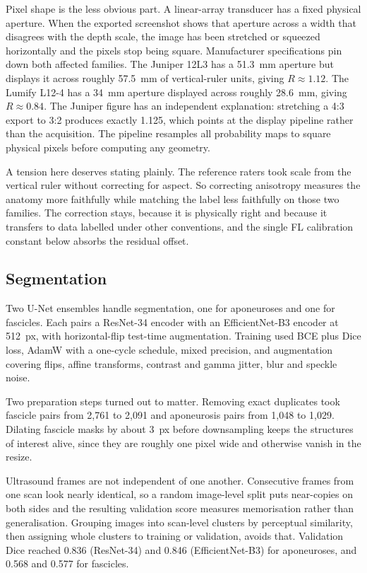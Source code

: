 \documentclass[12pt]{article}
\begin{document}
Pixel shape is the less obvious part. A linear-array transducer has a fixed
physical aperture. When the exported screenshot shows that aperture across a
width that disagrees with the depth scale, the image has been stretched or
squeezed horizontally and the pixels stop being square. Manufacturer
specifications pin down both affected families. The Juniper 12L3 has a 51.3~mm
aperture but displays it across roughly 57.5~mm of vertical-ruler units, giving
$R \approx 1.12$. The Lumify L12-4 has a 34~mm aperture displayed across roughly
28.6~mm, giving $R \approx 0.84$. The Juniper figure has an independent
explanation: stretching a 4:3 export to 3:2 produces exactly 1.125, which points
at the display pipeline rather than the acquisition. The pipeline resamples all
probability maps to square physical pixels before computing any geometry.

A tension here deserves stating plainly. The reference raters took scale from
the vertical ruler without correcting for aspect. So correcting anisotropy
measures the anatomy more faithfully while matching the label less faithfully on
those two families. The correction stays, because it is physically right and
because it transfers to data labelled under other conventions, and the single FL
calibration constant below absorbs the residual offset.

\subsection{Segmentation}

Two U-Net ensembles handle segmentation, one for aponeuroses and one for
fascicles. Each pairs a ResNet-34 \citep{he2016} encoder with an EfficientNet-B3
\citep{tan2019} encoder at 512~px, with horizontal-flip test-time augmentation.
Training used BCE plus Dice loss, AdamW with a one-cycle schedule, mixed
precision, and augmentation covering flips, affine transforms, contrast and
gamma jitter, blur and speckle noise.

Two preparation steps turned out to matter. Removing exact duplicates took
fascicle pairs from 2{,}761 to 2{,}091 and aponeurosis pairs from 1{,}048 to
1{,}029. Dilating fascicle masks by about 3~px before downsampling keeps the
structures of interest alive, since they are roughly one pixel wide and
otherwise vanish in the resize.

Ultrasound frames are not independent of one another. Consecutive frames from
one scan look nearly identical, so a random image-level split puts near-copies
on both sides and the resulting validation score measures memorisation rather
than generalisation. Grouping images into scan-level clusters by perceptual
similarity, then assigning whole clusters to training or validation, avoids
that. Validation Dice reached 0.836 (ResNet-34) and 0.846 (EfficientNet-B3) for
aponeuroses, and 0.568 and 0.577 for fascicles.
\end{document}
